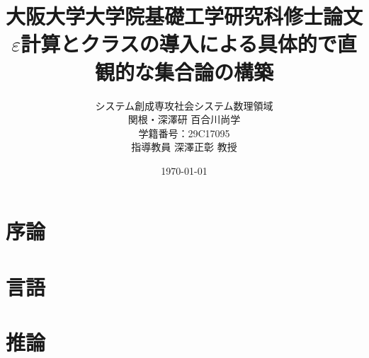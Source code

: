 \documentclass[a4j,10.5pt,oneside,openany,report]{jsbook}
\title{大阪大学大学院基礎工学研究科修士論文 \\[1cm]
$\varepsilon$計算とクラスの導入による具体的で直観的な集合論の構築 \\[7cm]}%
\author{システム創成専攻社会システム数理領域 \\ 関根・深澤研 百合川尚学 \\ 
学籍番号：29C17095 \\ 指導教員 深澤正彰 教授}
\date{\today}
\theoremstyle{mystyle}
\begin{document}
\maketitle
\tableofcontents

%
\chapter{序論}
	

\chapter{言語}
\label{chap:languages}
	
	
	
	
	
	
	
	
	

\chapter{推論}
\label{chap:inference}
	
	
	
	
%	
\end{document}
